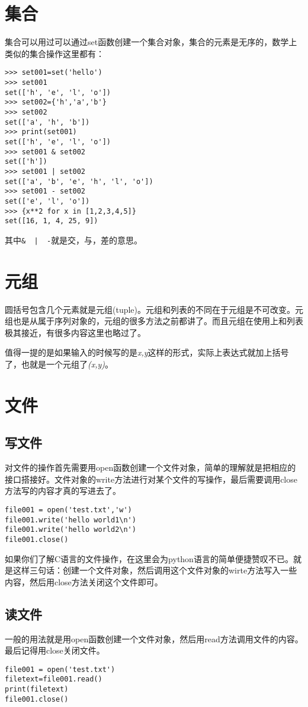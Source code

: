 \documentclass[12pt,oneside]{book}
\begin{document}
\begin{common-format}
\section{集合}
集合可以用过可以通过set函数创建一个集合对象，集合的元素是无序的，数学上类似的集合操作这里都有：
\begin{Verbatim}
>>> set001=set('hello')
>>> set001
set(['h', 'e', 'l', 'o'])
>>> set002={'h','a','b'}
>>> set002
set(['a', 'h', 'b'])
>>> print(set001)
set(['h', 'e', 'l', 'o'])
>>> set001 & set002
set(['h'])
>>> set001 | set002
set(['a', 'b', 'e', 'h', 'l', 'o'])
>>> set001 - set002
set(['e', 'l', 'o'])
>>> {x**2 for x in [1,2,3,4,5]}
set([16, 1, 4, 25, 9])
\end{Verbatim}

其中\verb+&  |  -+就是交，与，差的意思。




\section{元组}
圆括号包含几个元素就是元组(tuple)。元组和列表的不同在于元组是不可改变。元组也是从属于序列对象的，元组的很多方法之前都讲了。而且元组在使用上和列表极其接近，有很多内容这里也略过了。

值得一提的是如果输入的时候写的是\textit{x,y}这样的形式，实际上表达式就加上括号了，也就是一个元组了\textit{(x,y)}。




\section{文件}

\subsection{写文件}
对文件的操作首先需要用open函数创建一个文件对象，简单的理解就是把相应的接口搭接好。文件对象的write方法进行对某个文件的写操作，最后需要调用close方法写的内容才真的写进去了。

\begin{Verbatim}
file001 = open('test.txt','w')
file001.write('hello world1\n')
file001.write('hello world2\n')
file001.close()
\end{Verbatim}

如果你们了解C语言的文件操作，在这里会为python语言的简单便捷赞叹不已。就是这样三句话：创建一个文件对象，然后调用这个文件对象的wirte方法写入一些内容，然后用close方法关闭这个文件即可。


\subsection{读文件}
一般的用法就是用open函数创建一个文件对象，然后用read方法调用文件的内容。最后记得用close关闭文件。
\begin{Verbatim}
file001 = open('test.txt')
filetext=file001.read()
print(filetext)
file001.close()
\end{Verbatim}


\end{common-format}
\end{document}
